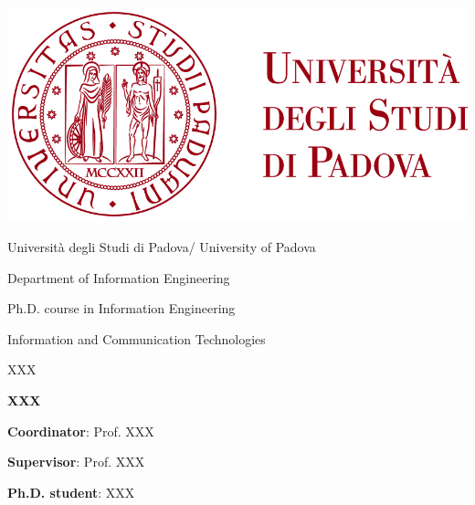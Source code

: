 \chapter*{}
{


\vspace{-4cm}
\begin{center}
    \includegraphics{figure/uni_logo.jpg}
\end{center}

\vspace{1cm}

Universit{\`a} degli Studi di Padova/ University of Padova

\vspace{0.3cm}

Department of Information Engineering

\vspace{0.3cm}

Ph.D. course in Information Engineering

\vspace{0.3cm}

Information and Communication Technologies

\vspace{0.3cm}

XXX

\vspace{1cm}

\begin{center}
\Large\textbf{XXX}
\end{center}


\vspace{2cm}

\textbf{Coordinator}: Prof. XXX

\vspace{0.3cm}

\textbf{Supervisor}: Prof. XXX

\vspace{3cm}

\begin{flushright}

\textbf{Ph.D. student}: XXX
\end{flushright}
}